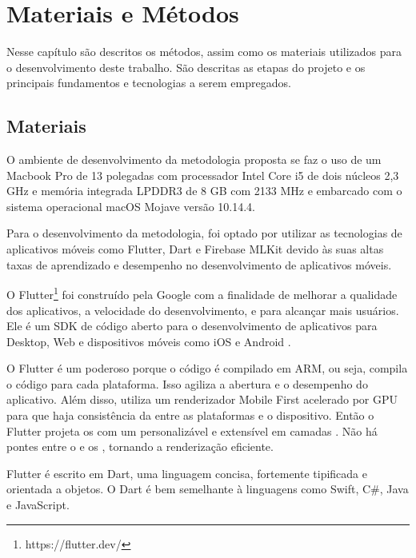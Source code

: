 \chapter{Materiais e Métodos} \label{cap:metod}

Nesse capítulo são descritos os métodos, assim como os materiais utilizados para o desenvolvimento deste trabalho. São descritas as etapas do projeto e os principais fundamentos e tecnologias a serem empregados.


\section{Materiais}
O ambiente de desenvolvimento da metodologia proposta se faz o uso de um Macbook Pro de 13 polegadas com processador Intel Core i5 de dois núcleos 2,3 GHz e memória integrada LPDDR3 de 8 GB com 2133 MHz e embarcado com o sistema operacional macOS Mojave versão 10.14.4.  

Para o desenvolvimento da metodologia, foi optado por utilizar as tecnologias de aplicativos móveis como Flutter, Dart e Firebase MLKit devido às suas altas taxas de aprendizado e desempenho no desenvolvimento de aplicativos móveis.

O Flutter\footnote{https://flutter.dev/} foi construído pela Google com a finalidade de melhorar a qualidade dos aplicativos, a velocidade do desenvolvimento, e para alcançar mais usuários. Ele é um SDK  de código aberto para o desenvolvimento de aplicativos para Desktop, Web e dispositivos móveis como iOS e Android \cite{ARSTECHNICA2017}.


O Flutter é um poderoso  porque o código é compilado em ARM, ou seja, compila o código para cada plataforma. Isso agiliza a abertura e o desempenho do aplicativo. Além disso, utiliza um renderizador Mobile First acelerado por GPU para que haja consistência da  entre as plataformas e o dispositivo. Então o Flutter projeta os  com um  personalizável e extensível em camadas \cite{IMASTERS}. Não há pontes entre o  e os , tornando a renderização eficiente. 

Flutter é escrito em Dart, uma linguagem concisa, fortemente tipificada e orientada a objetos. O Dart é bem semelhante à linguagens como Swift, C#, Java e JavaScript.



